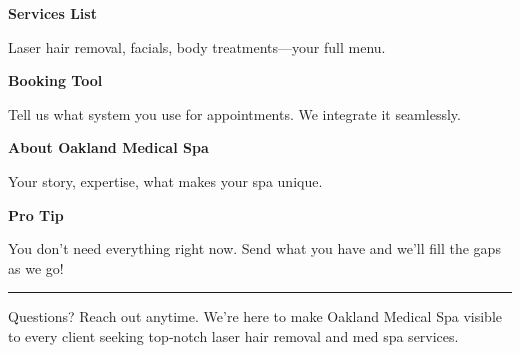 \documentclass[11pt,letterpaper]{article}
\begin{document}
\hfill
\begin{minipage}[t]{0.48\textwidth}
\begin{tcolorbox}[colframe=accent-teal, boxrule=1pt, left=0.7em, right=0.7em, top=0.5em, bottom=0.5em, arc=4pt, boxsep=0pt]
{\bfseries\small\color{accent-teal}Services List}

\vspace{0.15em}

{\small Laser hair removal, facials, body treatments—your full menu.}
\end{tcolorbox}

\vspace{0.1em}

\begin{tcolorbox}[colframe=accent-teal, boxrule=1pt, left=0.7em, right=0.7em, top=0.5em, bottom=0.5em, arc=4pt, boxsep=0pt]
{\bfseries\small\color{accent-teal}Booking Tool}

\vspace{0.15em}

{\small Tell us what system you use for appointments. We integrate it seamlessly.}
\end{tcolorbox}

\vspace{0.1em}

\begin{tcolorbox}[colframe=accent-teal, boxrule=1pt, left=0.7em, right=0.7em, top=0.5em, bottom=0.5em, arc=4pt, boxsep=0pt]
{\bfseries\small\color{accent-teal}About Oakland Medical Spa}

\vspace{0.15em}

{\small Your story, expertise, what makes your spa unique.}
\end{tcolorbox}

\vspace{-0.2em}
\end{minipage}

\vspace{0.15em}

\begin{tcolorbox}[colback={accent-red!5}, colframe=accent-red!20, boxrule=0.5pt, left=0.7em, right=0.7em, top=0.4em, bottom=0.4em, arc=6pt, boxsep=0pt]

{\bfseries\small\color{accent-red}Pro Tip}

\vspace{0.1em}

{\small You don't need everything right now. Send what you have and we'll fill the gaps as we go!}

\end{tcolorbox}

\vspace{0.15em}

\noindent\hrule
\vspace{0.2em}

{\small\color{text-light}Questions? Reach out anytime. We're here to make Oakland Medical Spa visible to every client seeking top‑notch laser hair removal and med spa services.}
\end{document}
